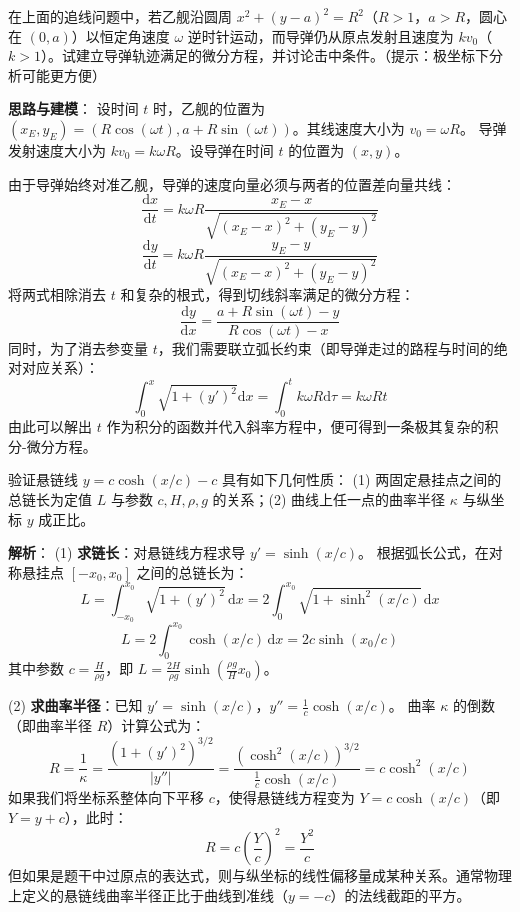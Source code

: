 \documentclass[lang=cn,11pt]{elegantbook}
\begin{document}
\begin{exercise}[提高：追击问题的变种]
在上面的追线问题中，若乙舰沿圆周 $x^{2}+(y-a)^{2}=R^{2}$（$R>1$，$a>R$，圆心在 $(0,a)$）以恒定角速度 $\omega$ 逆时针运动，而导弹仍从原点发射且速度为 $kv_0$（$k>1$）。试建立导弹轨迹满足的微分方程，并讨论击中条件。（提示：极坐标下分析可能更方便）
\end{exercise}
\begin{solution}
\textbf{思路与建模}：
设时间 $t$ 时，乙舰的位置为 $(x_E, y_E) = (R\cos(\omega t), a + R\sin(\omega t))$。其线速度大小为 $v_0 = \omega R$。
导弹发射速度大小为 $kv_0 = k\omega R$。设导弹在时间 $t$ 的位置为 $(x,y)$。

由于导弹始终对准乙舰，导弹的速度向量必须与两者的位置差向量共线：
\[
\frac{\mathrm{d}x}{\mathrm{d}t} = k\omega R \frac{x_E - x}{\sqrt{(x_E-x)^2 + (y_E-y)^2}}
\]
\[
\frac{\mathrm{d}y}{\mathrm{d}t} = k\omega R \frac{y_E - y}{\sqrt{(x_E-x)^2 + (y_E-y)^2}}
\]
将两式相除消去 $t$ 和复杂的根式，得到切线斜率满足的微分方程：
\[
\frac{\mathrm{d}y}{\mathrm{d}x} = \frac{a + R\sin(\omega t) - y}{R\cos(\omega t) - x}
\]
同时，为了消去参变量 $t$，我们需要联立弧长约束（即导弹走过的路程与时间的绝对对应关系）：
\[
\int_{0}^{x} \sqrt{1 + (y')^2} \mathrm{d}x = \int_0^t k\omega R \mathrm{d}\tau = k\omega R t
\]
由此可以解出 $t$ 作为积分的函数并代入斜率方程中，便可得到一条极其复杂的积分-微分方程。
\end{solution}

\begin{exercise}[悬链线的参数几何性质]
验证悬链线 $y=c\cosh(x/c)-c$ 具有如下几何性质：
(1) 两固定悬挂点之间的总链长为定值 $L$ 与参数 $c,H,\rho,g$ 的关系；(2) 曲线上任一点的曲率半径 $\kappa$ 与纵坐标 $y$ 成正比。
\end{exercise}
\begin{solution}
\textbf{解析}：
(1) \textbf{求链长}：对悬链线方程求导 $y' = \sinh(x/c)$。
根据弧长公式，在对称悬挂点 $[-x_0, x_0]$ 之间的总链长为：
\[
L = \int_{-x_0}^{x_0} \sqrt{1+(y')^2}\,\mathrm{d}x = 2 \int_0^{x_0} \sqrt{1+\sinh^2(x/c)}\,\mathrm{d}x
\]
\[
L = 2 \int_0^{x_0} \cosh(x/c)\,\mathrm{d}x = 2c\sinh(x_0/c)
\]
其中参数 $c = \frac{H}{\rho g}$，即 $L = \frac{2H}{\rho g}\sinh\left(\frac{\rho g}{H}x_0\right)$。

(2) \textbf{求曲率半径}：已知 $y' = \sinh(x/c)$，$y'' = \frac{1}{c}\cosh(x/c)$。
曲率 $\kappa$ 的倒数（即曲率半径 $R$）计算公式为：
\[
R = \frac{1}{\kappa} = \frac{(1+(y')^2)^{3/2}}{|y''|} = \frac{(\cosh^2(x/c))^{3/2}}{\frac{1}{c}\cosh(x/c)} = c\cosh^2(x/c)
\]
如果我们将坐标系整体向下平移 $c$，使得悬链线方程变为 $Y = c\cosh(x/c)$（即 $Y = y+c$），此时：
\[
R = c\left(\frac{Y}{c}\right)^2 = \frac{Y^2}{c}
\]
但如果是题干中过原点的表达式，则与纵坐标的线性偏移量成某种关系。通常物理上定义的悬链线曲率半径正比于曲线到准线（$y=-c$）的法线截距的平方。
\end{solution}
\end{document}
